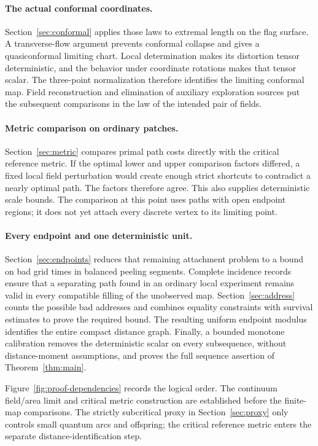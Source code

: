 \paragraph{The actual conformal coordinates.}
Section~\ref{sec:conformal} applies those laws to extremal length on the
flag surface. A transverse-flow argument prevents conformal collapse and
gives a quasiconformal limiting chart. Local determination makes its
distortion tensor deterministic, and the behavior under coordinate
rotations makes that tensor scalar. The three-point normalization therefore
identifies the limiting conformal map. Field reconstruction and elimination
of auxiliary exploration sources put the subsequent comparisons in the
law of the intended pair of fields.

\paragraph{Metric comparison on ordinary patches.}
Section~\ref{sec:metric} compares primal path costs directly with the
critical reference metric. If the optimal lower and upper comparison
factors differed, a fixed local field perturbation would create enough
strict shortcuts to contradict a nearly optimal path. The factors
therefore agree. This also supplies deterministic scale bounds. The
comparison at this point uses paths with open endpoint regions; it does
not yet attach every discrete vertex to its limiting point.

\paragraph{Every endpoint and one deterministic unit.}
Section~\ref{sec:endpoints} reduces that remaining attachment problem
to a bound on bad grid times in balanced peeling segments. Complete
incidence records ensure that a separating path found in an ordinary
local experiment remains valid in every compatible filling of the
unobserved map. Section~\ref{sec:address} counts the possible bad addresses
and combines equality constraints with survival estimates to prove the
required bound. The resulting uniform endpoint modulus identifies the
entire compact distance graph. Finally,
a bounded monotone calibration removes the deterministic scalar on every
subsequence, without distance-moment assumptions, and proves the full
sequence assertion of Theorem~\ref{thm:main}.

Figure~\ref{fig:proof-dependencies} records the logical order.  The
continuum field/area limit and critical metric construction are established
before the finite-map comparisons.  The strictly subcritical proxy in
Section~\ref{sec:proxy} only controls small quantum arcs and offspring; the
critical reference metric enters the separate distance-identification step.

